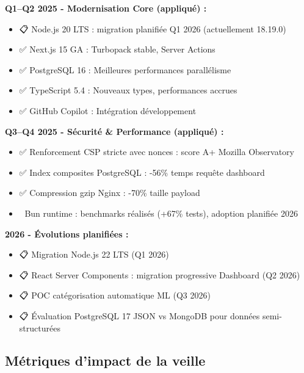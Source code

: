 \begin{tcolorbox}[colback=blue!5!white,colframe=blue!60!black,title=\textbf{Plan de migration et évolutions planifiées}]
\textbf{Q1--Q2 2025 - Modernisation Core (appliqué) :}
\begin{itemize}
    \item 📋 Node.js 20 LTS : migration planifiée Q1 2026 (actuellement 18.19.0)
    \item ✅ Next.js 15 GA : Turbopack stable, Server Actions
    \item ✅ PostgreSQL 16 : Meilleures performances parallélisme
    \item ✅ TypeScript 5.4 : Nouveaux types, performances accrues
    \item ✅ GitHub Copilot : Intégration développement
\end{itemize}

\textbf{Q3--Q4 2025 - Sécurité \& Performance (appliqué) :}
\begin{itemize}
    \item ✅ Renforcement CSP stricte avec nonces : score A+ Mozilla Observatory
    \item ✅ Index composites PostgreSQL : -56\% temps requête dashboard
    \item ✅ Compression gzip Nginx : -70\% taille payload
    \item 🔬 Bun runtime : benchmarks réalisés (+67\% tests), adoption planifiée 2026
\end{itemize}

\textbf{2026 - Évolutions planifiées :}
\begin{itemize}
    \item 📋 Migration Node.js 22 LTS (Q1 2026)
    \item 📋 React Server Components : migration progressive Dashboard (Q2 2026)
    \item 📋 POC catégorisation automatique ML (Q3 2026)
    \item 📋 Évaluation PostgreSQL 17 JSON vs MongoDB pour données semi-structurées
\end{itemize}
\end{tcolorbox}

\subsection{Métriques d'impact de la veille}

